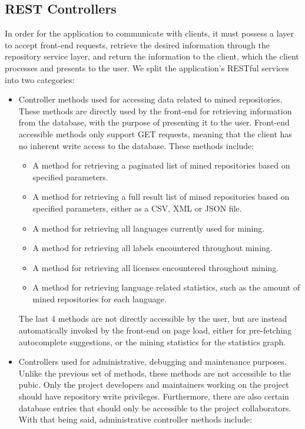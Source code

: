 \newpage
\subsection{REST Controllers}

In order for the application to communicate with clients, it must possess a layer to accept front-end requests, retrieve the desired information through the repository service layer, and return the information to the client, which the client processes and presents to the user. We split the application's RESTful services into two categories:

\begin{itemize}
    \item Controller methods used for accessing data related to mined repositories.
    \\These methods are directly used by the front-end for retrieving information from the database, with the purpose of presenting it to the user. Front-end accessible methods only support GET requests, meaning that the client has no inherent write access to the database. These methods include:
    \begin{itemize}
        \item A method for retrieving a paginated list of mined repositories based on specified parameters.
        \item A method for retrieving a full result list of mined repositories based on specified parameters, either as a CSV, XML or JSON file.
        \item A method for retrieving all languages currently used for mining.
        \item A method for retrieving all labels encountered throughout mining.
        \item A method for retrieving all licenses encountered throughout mining.
        \item A method for retrieving language related statistics, such as the amount of mined repositories for each language.
    \end{itemize}
    The last 4 methods are not directly accessible by the user, but are instead automatically invoked by the front-end on page load, either for pre-fetching autocomplete suggestions, or the mining statistics for the statistics graph.
    \item Controllers used for administrative, debugging and maintenance purposes.
    \\Unlike the previous set of methods, these methods are not accessible to the pubic. Only the project developers and maintainers working on the project should have repository write privileges. Furthermore, there are also certain database entries that should only be accessible to the project collaborators. With that being said, administrative controller methods include:

\end{itemize}
